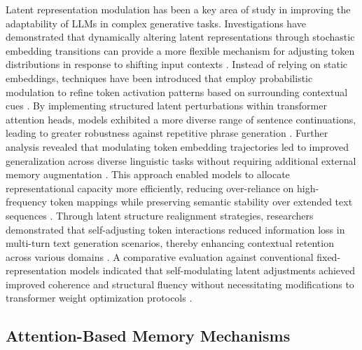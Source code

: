 \documentclass{article}
\begin{document}
Latent representation modulation has been a key area of study in improving the adaptability of LLMs in complex generative tasks. Investigations have demonstrated that dynamically altering latent representations through stochastic embedding transitions can provide a more flexible mechanism for adjusting token distributions in response to shifting input contexts \cite{kuse2024dynamic}. Instead of relying on static embeddings, techniques have been introduced that employ probabilistic modulation to refine token activation patterns based on surrounding contextual cues \cite{higginbotham2024prompting}. By implementing structured latent perturbations within transformer attention heads, models exhibited a more diverse range of sentence continuations, leading to greater robustness against repetitive phrase generation \cite{vitiello2024context}. Further analysis revealed that modulating token embedding trajectories led to improved generalization across diverse linguistic tasks without requiring additional external memory augmentation \cite{korbanov2024hierarchical}. This approach enabled models to allocate representational capacity more efficiently, reducing over-reliance on high-frequency token mappings while preserving semantic stability over extended text sequences \cite{harrow2024contextual}. Through latent structure realignment strategies, researchers demonstrated that self-adjusting token interactions reduced information loss in multi-turn text generation scenarios, thereby enhancing contextual retention across various domains \cite{ikaris2024context}. A comparative evaluation against conventional fixed-representation models indicated that self-modulating latent adjustments achieved improved coherence and structural fluency without necessitating modifications to transformer weight optimization protocols \cite{wench2024factored}.

\subsection{Attention-Based Memory Mechanisms}
\end{document}
